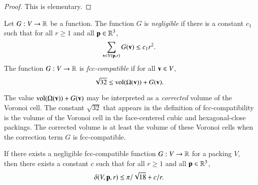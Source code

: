\begin{proof}  This is elementary.
\end{proof}

\begin{definition}\label{def:negligible}
Let $G: V\to{\mathbb R}$ be a function.  The function $G$
is {\it negligible\/}
if there is a constant $c_1$ such that for all $r\ge1$ and all
${\mathbf p}\in\mathbb{R}^3$,
   $$\sum_{{\mathbf v}\in V({\mathbf p},r)} G({\mathbf v}) \le c_1 r^2.$$
The function $G: V\to{\mathbb R}$ is
  {\it fcc-compatible\/}
if for all ${\mathbf v}\in V$, 
$$\sqrt{32}\le {\operatorname{vol}}(\Omega({\mathbf v})) + G({\mathbf v}).$$
%
%
%
\end{definition}





\begin{remark}
The value ${\operatorname{vol}}(\Omega({\mathbf v})) + G({\mathbf v})$ may be interpreted as a
{\it corrected\/} volume of the Voronoi
cell. The constant $\sqrt{32}$ that appears in the definition of fcc-compatibility is the volume of the Voronoi cell in the face-centered cubic and hexagonal-close packings.  The corrected volume is at least the volume of these
Voronoi cells when the correction term $G$ is fcc-compatible.
%
\end{remark}



\begin{lemma}
\label{lemma:deltabound} If there exists a %
negligible  fcc-compatible function%
$G: V\to{\mathbb R}$ for a 
packing $ V$, then there
exists a constant $c$ such that for all $r\ge1$ and all
${\mathbf p}\in\mathbb{R}^3$,
    $$
    \delta( V,{\mathbf p},r)
    \le \pi/\sqrt{18} + c/r.
    $$
\end{lemma}

